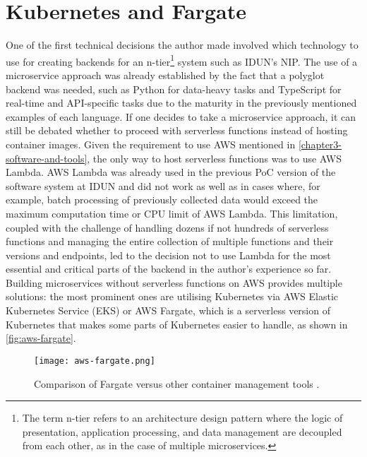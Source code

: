 \section*{Kubernetes and Fargate}
\label{chapter4-kubernetes-and-aws-fargate}

One of the first technical decisions the author made involved which technology to use for creating backends for an n-tier\footnote{The term n-tier refers to an architecture design pattern where the logic of presentation, application processing, and data management are decoupled from each other, as in the case of multiple microservices.} system such as IDUN’s NIP. The use of a microservice approach was already established by the fact that a polyglot backend was needed, such as Python for data-heavy tasks and TypeScript for real-time and API-specific tasks due to the maturity in the previously mentioned examples of each language. If one decides to take a microservice approach, it can still be debated whether to proceed with serverless functions instead of hosting container images. Given the requirement to use AWS mentioned in \autoref{chapter3-software-and-tools}, the only way to host serverless functions was to use AWS Lambda. AWS Lambda was already used in the previous PoC version of the software system at IDUN and did not work as well as in cases where, for example, batch processing of previously collected data would exceed the maximum computation time or CPU limit of AWS Lambda. This limitation, coupled with the challenge of handling dozens if not hundreds of serverless functions and managing the entire collection of multiple functions and their versions and endpoints, led to the decision not to use Lambda for the most essential and critical parts of the backend in the author’s experience so far. Building microservices without serverless functions on AWS provides multiple solutions: the most prominent ones are utilising Kubernetes via AWS Elastic Kubernetes Service (EKS) or AWS Fargate, which is a serverless version of Kubernetes \citep{amazon_web_services_inc_serverless_nodate} that makes some parts of Kubernetes easier to handle, as shown in \autoref{fig:aws-fargate}.

\begin{figure}[!ht]
  \centering
  \texttt{[image: aws-fargate.png]}
  \caption[Comparison of Fargate versus other container management tools.]{Comparison of Fargate versus other container management tools \citep{amazon_web_services_inc_serverless_nodate}.}
  \label{fig:aws-fargate}
\end{figure}


